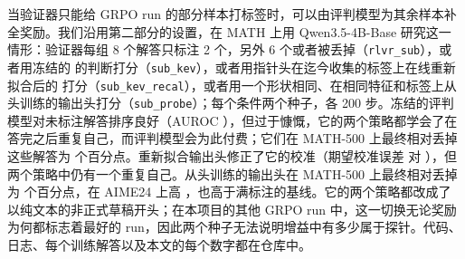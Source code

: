 当验证器只能给 GRPO run 的部分样本打标签时，可以由评判模型为其余样本补全奖励。我们沿用第二部分的设置，在 MATH 上用 Qwen3.5-4B-Base 研究这一情形：验证器每组 8 个解答只标注 2 个，另外 6 个或者被丢掉（\texttt{rlvr\_sub}），或者用冻结的 \kev{} 的判断打分（\texttt{sub\_kev}），或者用指针头在迄今收集的标签上在线重新拟合后的 \kev{} 打分（\texttt{sub\_kev\_recal}），或者用一个形状相同、在相同特征和标签上从头训练的输出头打分（\texttt{sub\_probe}）；每个条件两个种子，各 200 步。冻结的评判模型对未标注解答排序良好（AUROC ），但过于慷慨，它的两个策略都学会了在答完之后重复自己，而评判模型会为此付费；它们在 MATH-500 上最终相对丢掉这些解答为   个百分点。重新拟合输出头修正了它的校准（期望校准误差  对 ），但两个策略中仍有一个重复自己。从头训练的输出头在 MATH-500 上最终相对丢掉为   个百分点，在 AIME24 上高 ，也高于满标注的基线。它的两个策略都改成了以纯文本的非正式草稿开头；在本项目的其他 GRPO run 中，这一切换无论奖励为何都标志着最好的 run，因此两个种子无法说明增益中有多少属于探针。代码、日志、每个训练解答以及本文的每个数字都在仓库中。
